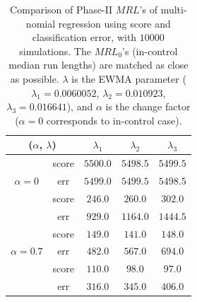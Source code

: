 \documentclass[twoside,11pt]{article}
\begin{document}
\begin{table}[!t]
\centering
\begin{tabular}{ccccc}
\toprule
\multicolumn{2}{c}{($ \alpha$, $ \lambda$)} & $ \lambda_1$ & $ \lambda_2$ & $ \lambda_3$ \\
\midrule
\multirow{3}{*}{$\alpha=0$} & score &$5500.0$ & $5498.5$ & $5499.5$ \\
& err &$5499.0$ & $5499.5$ & $5498.5$ \\
\midrule
\multirow{3}{*}{$\alpha=0.5$} & score &$\bm{246.0}$ & $\bm{260.0}$ & $\bm{302.0}$ \\
& err &$929.0$ & $1164.0$ & $1444.5$ \\
\midrule
\multirow{3}{*}{$\alpha=0.7$} & score &$\bm{149.0}$ & $\bm{141.0}$ & $\bm{148.0}$ \\
& err &$482.0$ & $567.0$ & $694.0$ \\
\midrule
\multirow{3}{*}{$\alpha=0.9$} & score &$\bm{110.0}$ & $\bm{98.0}$ & $\bm{97.0}$ \\
& err &$316.0$ & $345.0$ & $406.0$ \\
\midrule
\end{tabular}
\caption{Comparison of Phase-II $MRL$'s of multi-nomial regression using score and classification error, with $10000$ simulations. The $MRL_0$'s (in-control median run lengths) are matched as close as possible. $ \lambda$ is the EWMA parameter ({$ \lambda_1 = 0.0060052$}, {$ \lambda_2 = 0.010923$}, {$ \lambda_3 = 0.016641$}), and $ \alpha$ is the change factor ($ \alpha=0$ corresponds to in-control case).}
\label{tab:multi_logi_MRL}
\end{table}
\end{document}
